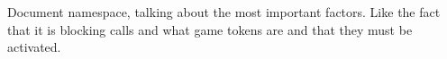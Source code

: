 
\begin{DoxyRefList}
\item[\label{todo__todo000001}%
\hypertarget{todo__todo000001}{}%
Namespace \hyperlink{namespacekjapp}{kjapp} ]Document namespace, talking about the most important factors. Like the fact that it is blocking calls and what game tokens are and that they must be activated. 
\end{DoxyRefList}